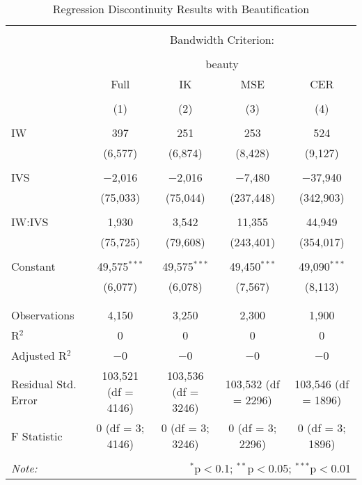 
\begin{table}[H] \centering 
  \caption{Regression Discontinuity Results with Beautification} 
  \label{rdd_cutoff_table_beauty} 
\small 
\begin{tabular}{@{\extracolsep{0pt}}lcccc} 
\\[-1.8ex]\hline 
\hline \\[-1.8ex] 
 & \multicolumn{4}{c}{Bandwidth Criterion:} \\ 
\cline{2-5} 
\\[-1.8ex] & \multicolumn{4}{c}{beauty} \\ 
 & Full & IK & MSE & CER \\ 
\\[-1.8ex] & (1) & (2) & (3) & (4)\\ 
\hline \\[-1.8ex] 
 IW & 397 & 251 & 253 & 524 \\ 
  & (6,577) & (6,874) & (8,428) & (9,127) \\ 
  & & & & \\ 
 IVS & $-$2,016 & $-$2,016 & $-$7,480 & $-$37,940 \\ 
  & (75,033) & (75,044) & (237,448) & (342,903) \\ 
  & & & & \\ 
 IW:IVS & 1,930 & 3,542 & 11,355 & 44,949 \\ 
  & (75,725) & (79,608) & (243,401) & (354,017) \\ 
  & & & & \\ 
 Constant & 49,575$^{***}$ & 49,575$^{***}$ & 49,450$^{***}$ & 49,090$^{***}$ \\ 
  & (6,077) & (6,078) & (7,567) & (8,113) \\ 
  & & & & \\ 
\hline \\[-1.8ex] 
Observations & 4,150 & 3,250 & 2,300 & 1,900 \\ 
R$^{2}$ & 0 & 0 & 0 & 0 \\ 
Adjusted R$^{2}$ & $-$0 & $-$0 & $-$0 & $-$0 \\ 
Residual Std. Error & 103,521 (df = 4146) & 103,536 (df = 3246) & 103,532 (df = 2296) & 103,546 (df = 1896) \\ 
F Statistic & 0 (df = 3; 4146) & 0 (df = 3; 3246) & 0 (df = 3; 2296) & 0 (df = 3; 1896) \\ 
\hline 
\hline \\[-1.8ex] 
\textit{Note:}  & \multicolumn{4}{r}{$^{*}$p$<$0.1; $^{**}$p$<$0.05; $^{***}$p$<$0.01} \\ 
\end{tabular} 
\end{table} 
